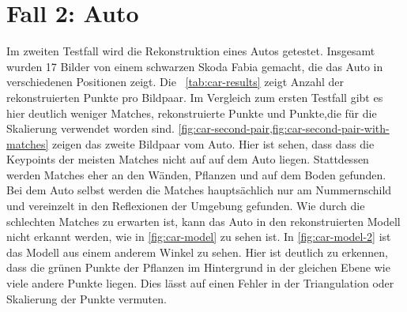 \section{Fall 2: Auto}
\label{sec:testcase-car}
Im zweiten Testfall wird die Rekonstruktion eines Autos getestet. 
Insgesamt wurden 17 Bilder von einem schwarzen Skoda Fabia gemacht, die das Auto in verschiedenen Positionen zeigt.
Die ~\cref{tab:car-results} zeigt Anzahl der rekonstruierten Punkte pro Bildpaar.
Im Vergleich zum ersten Testfall gibt es hier deutlich weniger Matches, rekonstruierte Punkte und Punkte,die für die Skalierung verwendet worden sind.
\cref{fig:car-second-pair,fig:car-second-pair-with-matches} zeigen das zweite Bildpaar vom Auto.
Hier ist sehen, dass dass die Keypoints der meisten Matches nicht auf auf dem Auto liegen.
Stattdessen werden Matches eher an den Wänden, Pflanzen und auf dem Boden gefunden.
Bei dem Auto selbst werden die Matches hauptsächlich nur am Nummernschild und vereinzelt in den Reflexionen der Umgebung gefunden.
Wie durch die schlechten Matches zu erwarten ist, kann das Auto in den rekonstruierten Modell nicht erkannt werden, wie in \cref{fig:car-model} zu sehen ist.
In \cref{fig:car-model-2} ist das Modell aus einem anderem Winkel zu sehen.
Hier ist deutlich zu erkennen, dass die grünen Punkte der Pflanzen im Hintergrund in der gleichen Ebene wie viele andere Punkte liegen. 
Dies lässt auf einen Fehler in der Triangulation oder Skalierung der Punkte vermuten.

